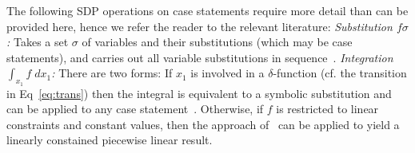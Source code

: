 \documentclass{article} %
\begin{document}
The following SDP operations on case statements require more detail than can be provided here, hence we refer the reader to the relevant literature:
{\it Substitution $f\sigma$:} Takes a set $\sigma$ of variables and their substitutions (which may be case statements), and carries out all variable substitutions in sequence~\cite{sanner_uai11}.
{\it Integration $\int_{x_1} f \; dx_1$:}  There are two forms: If $x_1$ is involved in a $\delta$-function (cf. the transition in Eq~\eqref{eq:trans}) then the integral is equivalent to a symbolic substitution and can be applied to any case statement~\cite{sanner_uai11}. Otherwise, if $f$ is restricted to linear constraints and constant values, then the approach of~\cite{sanner_aaai12} can be applied to yield a linearly constained piecewise linear result.
\end{document}
